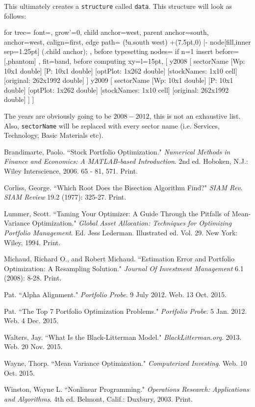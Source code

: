 \documentclass[12pt,titlepage,letter]{article}
\begin{document}
		This ultimately creates a \verb|structure| called \verb|data|. This structure will look as follows:
		\begin{center}
		\begin{forest}
			for tree={
			font=\ttfamily,
			grow'=0,
			child anchor=west,
			parent anchor=south,
			anchor=west,
			calign=first,
			edge path={
			\noexpand{}
			(!u.south west) +(7.5pt,0) |- node[fill,inner sep=1.25pt] {} (.child anchor);
			},
			before typesetting nodes={
			if n=1
			{insert before={[,phantom]}}
			{}
			},
			fit=band,
			before computing xy={l=15pt},
			}
			[
				y2008
					[
						sectorName
						[Wp: 10x1 double]
					    [P: 10x1 double]
					    [optPlot: 1x262 double]
					    [stockNames: 1x10 cell]
					    [original: 262x1992 double]
					]
				y2009
					[
						sectorName
						[Wp: 10x1 double]
					    [P: 10x1 double]
					    [optPlot: 1x262 double]
					    [stockNames: 1x10 cell]
					    [original: 262x1992 double]
					]
			]
		\end{forest}
		\end{center}
		The years are obviously going to be $2008-2012$, this is not an exhaustive list. Also, \verb|sectorName| will be replaced with every sector name (i.e. Services, Technology, Basic Materials etc).
\newpage

\begin{thebibliography}{10}
	 Brandimarte, Paolo. ``Stock Portfolio Optimization."  \emph{Numerical Methods in Finance and Economics: A MATLAB-based Introduction}. 2nd ed. Hoboken, N.J.: Wiley Interscience, 2006. 65 - 81, 571. Print.

	 Corliss, George. ``Which Root Does the Bisection Algorithm Find?" \emph{SIAM Rev. SIAM Review} 19.2 (1977): 325-27. Print.
	
	 Lummer, Scott. ``Taming Your Optimizer: A Guide Through the Pitfalls of Mean-Variance Optimization." \emph{Global Asset Allocation: Techniques for Optimizing Portfolio Management}. Ed. Jess Lederman. Illustrated ed. Vol. 29. New York: Wiley, 1994. Print.
	
	 Michaud, Richard O., and Robert Michaud. ``Estimation Error and Portfolio Optimization: A Resampling Solution." \emph{Journal Of Investment Management} 6.1 (2008): 8-28. Print.
	
	 Pat. ``Alpha Alignment." \emph{Portfolio Probe}. 9 July 2012. Web. 13 Oct. 2015.
	
	 Pat. ``The Top 7 Portfolio Optimization Problems."  \emph{Portfolio Probe}. 5 Jan. 2012. Web. 4 Dec. 2015.

	 Walters, Jay. ``What Is the Black-Litterman Model." \emph{BlackLitterman.org}. 2013. Web. 20 Nov. 2015.

	 Wayne, Thorp. ``Mean Variance Optimization."  \emph{Computerized Investing}. Web. 10 Oct. 2015.
	
	 Winston, Wayne L. ``Nonlinear Programming."  \emph{Operations Research: Applications and Algorithms}. 4th ed. Belmont, Calif.: Duxbury, 2003. Print.
\end{thebibliography}
\end{document}
